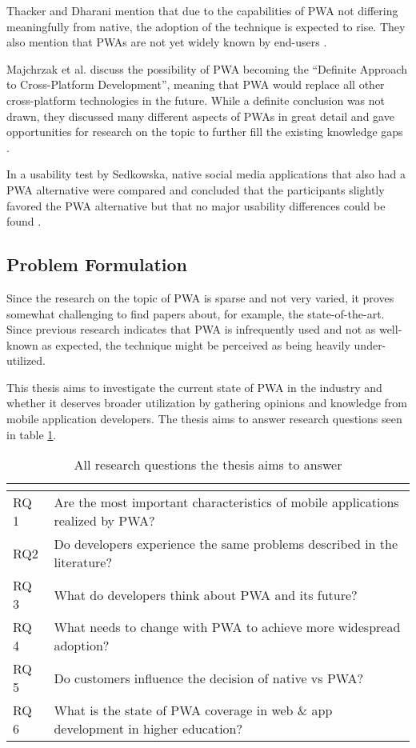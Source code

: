 \documentclass[a4paper,12pt]{article}
\begin{document}
Thacker and Dharani mention that due to the capabilities of PWA not differing meaningfully from native, the adoption of the technique is expected to rise. They also mention that PWAs are not yet widely known by end-users \cite{realize_native_with_pwa}.

Majchrzak et al. discuss the possibility of PWA becoming the “Definite Approach to Cross-Platform Development”, meaning that PWA would replace all other cross-platform technologies in the future. While a definite conclusion was not drawn, they discussed many different aspects of PWAs in great detail and gave opportunities for research on the topic to further fill the existing knowledge gaps \cite{pwa_definite_approach}.

In a usability test by Sedkowska, native social media applications that also had a PWA alternative were compared and concluded that the participants slightly favored the PWA alternative but that no major usability differences could be found \cite{thesis_pwa_ux}.

\subsection{Problem Formulation}
Since the research on the topic of PWA is sparse and not very varied, it proves somewhat challenging to find papers about, for example, the state-of-the-art. Since previous research indicates that PWA is infrequently used and not as well-known as expected, the technique might be perceived as being heavily under-utilized. 

This thesis aims to investigate the current state of PWA in the industry and whether it deserves broader utilization by gathering opinions and knowledge from mobile application developers. The thesis aims to answer research questions seen in table \ref{tab:rqs}.

\begin{table}[t]
\centering
{}
\begin{tabular}{|l|p{12.5cm}|}
\hline
\multicolumn{2}{|c|}{\cellcolor[HTML]{343434}{\color[HTML]{FFFFFF} Research questions}} \\ \hline
RQ 1 & Are the most important characteristics of mobile applications realized by PWA? \\
RQ2 & Do developers experience the same problems described in the literature? \\
RQ 3 & What do developers think about PWA and its future? \\
RQ 4 & What needs to change with PWA to achieve more widespread adoption? \\
RQ 5 & Do customers influence the decision of native vs PWA? \\
RQ 6 & What is the state of PWA coverage in web \& app development in higher education? \\ \hline
\end{tabular}
\caption{All research questions the thesis aims to answer}
\label{tab:rqs}
\end{table}
\end{document}
